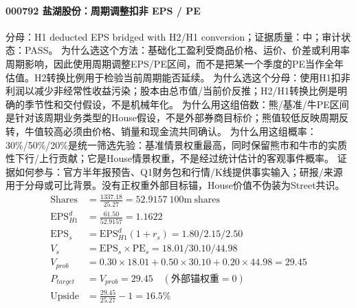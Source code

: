 \paragraph{000792 盐湖股份：周期调整扣非 EPS / PE}
分母：H1 deducted EPS bridged with H2/H1 conversion；证据质量：中；审计状态：PASS。
为什么选这个方法：基础化工盈利受商品价格、运价、价差或利用率周期影响，因此使用周期调整EPS/PE区间，而不是把某一个季度的PE当作全年估值。H2转换比例用于检验当前周期能否延续。
为什么选这个分母：使用H1扣非利润以减少非经常性收益污染；股本由总市值/当前价反推；H2/H1转换比例是明确的季节性和交付假设，不是机械年化。
为什么用这组倍数：熊/基准/牛PE区间是针对该周期业务类型的House假设，不是外部券商目标价；熊值较低反映周期反转，牛值较高必须由价格、销量和现金流共同确认。
为什么用这组概率：30\%/50\%/20\%是统一筛选先验：基准情景权重最高，同时保留熊市和牛市的实质性下行/上行贡献；它是House情景权重，不是经过统计估计的客观事件概率。
证据如何参与：官方半年报预告、Q1财务包和行情/K线提供事实输入；研报/来源用于分母或可比背景。没有正权重外部目标锚，House价值不伪装为Street共识。
\begin{align*}
\mathrm{Shares} &= \frac{1337.18}{25.27}=52.9157\ \mathrm{100m\ shares}\\
\mathrm{EPS}_{H1}^d &= \frac{61.50}{52.9157}=1.1622\\
\mathrm{EPS}_s &= \mathrm{EPS}_{H1}^d(1+r_s)=1.80/2.15/2.50\\
V_s &= \mathrm{EPS}_s\times \mathrm{PE}_s=18.01/30.10/44.98\\
V_{prob} &= 0.30\times 18.01+0.50\times 30.10+0.20\times 44.98=29.45\\
P_{target} &= V_{prob}=29.45\quad(\text{外部锚权重}=0)\\
\mathrm{Upside} &= \frac{29.45}{25.27}-1=16.5\%\\
\end{align*}

